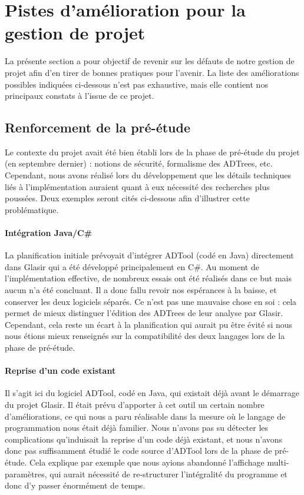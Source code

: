\section{Pistes d'amélioration pour la gestion de projet}
\label{sec:plusMieux}

La présente section a pour objectif de revenir sur les défauts de notre gestion de projet afin d'en tirer de bonnes pratiques pour l'avenir. La liste des améliorations possibles indiquées ci-dessous n'est pas exhaustive, mais elle contient nos principaux constats à l'issue de ce projet.

\subsection{Renforcement de la pré-étude}
\label{ssec:pre-etude}

Le contexte du projet avait été bien établi lors de la phase de pré-étude du projet (en septembre dernier) : notions de sécurité, formalisme des ADTrees, etc. Cependant, nous avons réalisé lors du développement que les détails techniques liés à l'implémentation auraient quant à eux nécessité des recherches plus poussées. Deux exemples seront cités ci-dessous afin d'illustrer cette problématique.

\paragraph{Intégration Java/C\#} La planification initiale prévoyait d'intégrer ADTool (codé en Java) directement dans Glasir qui a été développé principalement en C\#. Au moment de l'implémentation effective, de nombreux essais ont été réalisés dans ce but mais aucun n'a été concluant. Il a donc fallu revoir nos espérances à la baisse, et conserver les deux logiciels séparés. Ce n'est pas une mauvaise chose en soi : cela permet de mieux distinguer l'édition des ADTrees de leur analyse par Glasir. Cependant, cela reste un écart à la planification qui aurait pu être évité si nous nous étions mieux renseignés sur la compatibilité des deux langages lors de la phase de pré-étude.

\paragraph{Reprise d'un code existant} Il s'agit ici du logiciel ADTool, codé en Java, qui existait déjà avant le démarrage du projet Glasir. Il était prévu d'apporter à cet outil un certain nombre d'améliorations, ce qui nous a paru réalisable dans la mesure où le langage de programmation nous était déjà familier. Nous n'avons pas su détecter les complications qu'induisait la reprise d'un code déjà existant, et nous n'avons donc pas suffisamment étudié le code source d'ADTool lors de la phase de pré-étude. Cela explique par exemple que nous ayions abandonné l'affichage multi-paramètres, qui aurait nécessité de re-structurer l'intégralité du programme et donc d'y passer énormément de temps.

